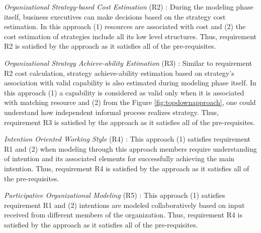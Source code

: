 \textit{Organizational Strategy-based Cost Estimation} (R2) : During the modeling phase itself, business executives can make decisions based on the strategy cost estimation. In this approach (1) resources are associated with cost and (2) the cost estimation of strategies include all its low level structures. Thus, requirement R2 is satisfied by the approach as it satisfies all of the pre-requisites. 

\textit{Organizational Strategy Achieve-ability Estimation} (R3) : Similar to requirement R2 cost calculation, strategy achieve-ability estimation based on strategy's association with valid capability is also estimated during modeling phase itself. In this approach (1) a capability is considered as valid only when it is associated with matching resource and (2) from the Figure \ref{fig:topdownapproach}, one could understand how independent informal process realizes strategy. Thus, requirement R3 is satisfied by the approach as it satisfies all of the pre-requisites.

\textit{Intention Oriented Working Style} (R4) : This approach (1) satisfies requirement R1 and (2) when modeling through this approach members require understanding of intention and its associated elements for successfully achieving the main intention. Thus, requirement R4 is satisfied by the approach as it satisfies all of the pre-requisites.

\textit{Participative Organizational Modeling} (R5) : This approach (1) satisfies requirement R1 and  (2) intentions are modeled collaboratively based on input received from different members of the organization. Thus, requirement R4 is satisfied by the approach as it satisfies all of the pre-requisites. 

